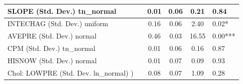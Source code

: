 \begin{table}
\begin{center}
\begin{tabular}{|l|l|c|c|c|l|}
			\hline
			SLOPE (Std. Dev.) tn_normal &  & 0.01 & 0.06 & 0.21 & 0.84 \\
			\hline
			INTECHAG (Std. Dev.) uniform &  & 0.16 & 0.06 & 2.40 & 0.02* \\
			\hline
			AVEPRE (Std. Dev.) normal &  & 0.46 & 0.03 & 16.55 & 0.00*** \\
			\hline
			CPM (Std. Dev.) tn_normal &  & 0.01 & 0.06 & 0.16 & 0.87 \\
			\hline
			HISNOW (Std. Dev.) normal &  & 0.01 & 0.07 & 0.09 & 0.93 \\
			\hline
			 Chol: LOWPRE (Std. Dev. ln_normal) ) &  & 0.08 & 0.07 & 1.09 & 0.28 \\
			\hline
		\end{tabular}
	\end{center}
\end{table}